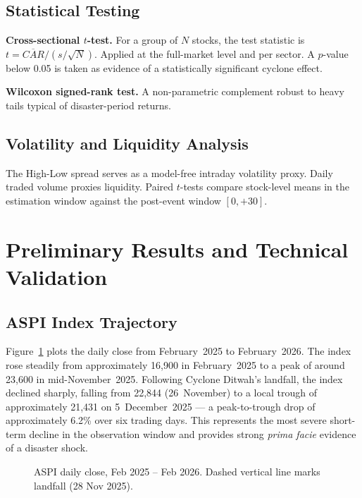 \documentclass[sigconf, nonacm]{acmart}
\begin{document}
\subsection{Statistical Testing}
\textbf{Cross-sectional $t$-test.} For a group of $N$ stocks, the test statistic is $t = \overline{CAR} / (s / \sqrt{N})$. Applied at the full-market level and per sector. A $p$-value below 0.05 is taken as evidence of a statistically significant cyclone effect.

\textbf{Wilcoxon signed-rank test.} A non-parametric complement robust to heavy tails typical of disaster-period returns.

\subsection{Volatility and Liquidity Analysis}
The High-Low spread serves as a model-free intraday volatility proxy. Daily traded volume proxies liquidity. Paired $t$-tests compare stock-level means in the estimation window against the post-event window $[0,+30]$.

\section{Preliminary Results and Technical Validation}

\subsection{ASPI Index Trajectory}
Figure~\ref{fig:aspi} plots the daily close from February~2025 to February~2026. The index rose steadily from approximately 16,900 in February~2025 to a peak of around 23,600 in mid-November~2025. Following Cyclone Ditwah's landfall, the index declined sharply, falling from 22,844 (26~November) to a local trough of approximately 21,431 on 5~December~2025 --- a peak-to-trough drop of approximately 6.2\% over six trading days. This represents the most severe short-term decline in the observation window and provides strong \textit{prima facie} evidence of a disaster shock.

\begin{figure}[h]
  \centering
  \vspace{3cm} %
  \caption{ASPI daily close, Feb 2025 -- Feb 2026. Dashed vertical line marks landfall (28 Nov 2025).}
  \label{fig:aspi}
\end{figure}
\end{document}
